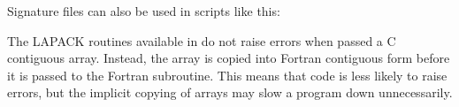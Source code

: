 Signature files can also be used in  scripts like this:




\begin{warn}
The LAPACK routines available in  do not raise errors when passed a C contiguous array.
Instead, the array is copied into Fortran contiguous form before it is passed to the Fortran subroutine.
This means that code is less likely to raise errors, but the implicit copying of arrays may slow a program down unnecessarily.
\end{warn}


